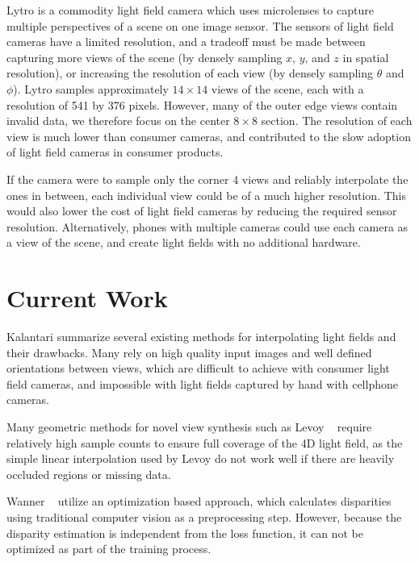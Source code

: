 \documentclass[10pt,twocolumn,letterpaper]{article}
\begin{document}
Lytro is a commodity light field camera which uses microlenses to capture multiple
perspectives of a scene on one image sensor. The sensors of light field cameras have a 
limited resolution, and a tradeoff must be made between capturing more views of the scene 
(by densely sampling $x$, $y$, and $z$ in spatial resolution), or increasing the resolution of each view 
(by densely sampling $\theta$ and $\phi$). 
Lytro samples approximately $14 \times 14$ views of the scene, each with a resolution of 541 by 376 pixels.
However, many of the outer edge views contain invalid data, we therefore focus on the center $8 \times 8$ section.
The resolution of each view is much lower than consumer cameras, 
and contributed to the slow adoption of light field cameras in consumer products.

If the camera were to sample only the corner 4 views and reliably interpolate the ones in between, each individual view
could be of a much higher resolution. This would also lower the cost of light field cameras by reducing the required
sensor resolution. Alternatively, phones with multiple cameras could use each camera as a 
view of the scene, and create light fields with no additional hardware. 

\section{Current Work}

Kalantari \etal summarize several existing methods for interpolating light fields and their drawbacks.
Many rely on high quality input images and well defined orientations between views,
which are difficult to achieve with consumer light field cameras, and impossible with light fields
captured by hand with cellphone cameras.

Many geometric methods for novel view synthesis 
such as Levoy \etal~\cite{levoy1996light} require relatively high sample counts to ensure full
coverage of the 4D light field, as the simple linear interpolation used by Levoy
do not work well if there are heavily occluded regions or missing data.

Wanner \etal~\cite{Wanner} utilize an optimization based approach, which calculates disparities
using traditional computer vision as a preprocessing step. However, because the disparity estimation
is independent from the loss function, it can not be optimized as part of the training process. 
\end{document}
